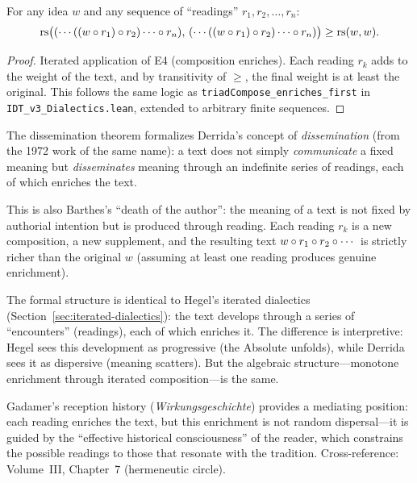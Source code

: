 \begin{theorem}
\label{thm:dissemination-enriches}
For any idea $w$ and any sequence of ``readings'' $r_1, r_2, \ldots, r_n$:
\[
\mathrm{rs}\bigl((\cdots((w \circ r_1) \circ r_2) \cdots \circ r_n),\,
(\cdots((w \circ r_1) \circ r_2) \cdots \circ r_n)\bigr) \geq \mathrm{rs}(w, w).
\]
\end{theorem}

\begin{proof}
Iterated application of E4 (composition enriches). Each reading $r_k$ adds to
the weight of the text, and by transitivity of $\geq$, the final weight is at
least the original. This follows the same logic as
\texttt{triadCompose\_enriches\_first} in \texttt{IDT\_v3\_Dialectics.lean},
extended to arbitrary finite sequences.
\end{proof}

\begin{interpretation}
The dissemination theorem formalizes Derrida's concept of \emph{dissemination}
(from the 1972 work of the same name): a text does not simply \emph{communicate}
a fixed meaning but \emph{disseminates} meaning through an indefinite series
of readings, each of which enriches the text.

This is also Barthes's ``death of the author'': the meaning of a text is not
fixed by authorial intention but is produced through reading. Each reading
$r_k$ is a new composition, a new supplement, and the resulting text
$w \circ r_1 \circ r_2 \circ \cdots$ is strictly richer than the
original $w$ (assuming at least one reading produces genuine enrichment).

The formal structure is identical to Hegel's iterated dialectics
(Section~\ref{sec:iterated-dialectics}): the text develops through a series
of ``encounters'' (readings), each of which enriches it. The difference is
interpretive: Hegel sees this development as progressive (the Absolute unfolds),
while Derrida sees it as dispersive (meaning scatters). But the algebraic
structure---monotone enrichment through iterated composition---is the same.

Gadamer's reception history (\textit{Wirkungsgeschichte}) provides a mediating
position: each reading enriches the text, but this enrichment is not random
dispersal---it is guided by the ``effective historical consciousness'' of the
reader, which constrains the possible readings to those that resonate with the
tradition. Cross-reference: Volume~III, Chapter~7 (hermeneutic circle).
\end{interpretation}

